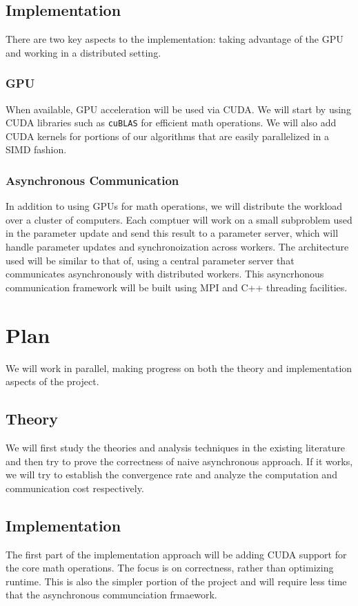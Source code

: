 \documentclass{article}
\begin{document}
\subsection{Implementation}
There are two key aspects to the implementation: taking advantage of the GPU and
working in a distributed setting.

\subsubsection{GPU}
When available, GPU acceleration will be used via CUDA. We will start by using
CUDA libraries such as \texttt{cuBLAS} for efficient math operations. We will
also add CUDA kernels for portions of our algorithms that are easily
parallelized in a SIMD fashion.

\subsubsection{Asynchronous Communication}
In addition to using GPUs for math operations, we will distribute the workload
over a cluster of computers. Each comptuer will work on a small subproblem used
in the parameter update and send this result to a parameter server, which will
handle parameter updates and synchronoization across workers. The architecture
used will be similar to that of\cite{li2014scaling}, using a central parameter server that
communicates asynchronously with distributed workers. This asyncrhonous
communication framework will be built using MPI and C++ threading facilities.

\section{Plan}
We will work in parallel, making progress on both the theory and implementation
aspects of the project.

\subsection{Theory}
We will first study the theories and analysis techniques in the existing
literature and then try to prove the correctness of naive asynchronous approach.
If it works, we will try to establish the convergence rate and analyze the
computation and communication cost respectively.  

\subsection{Implementation}
The first part of the implementation approach will be adding CUDA support for
the core math operations. The focus is on correctness, rather than optimizing
runtime. This is also the simpler portion of the project and will require less
time that the asynchronous communciation frmaework.
\end{document}
